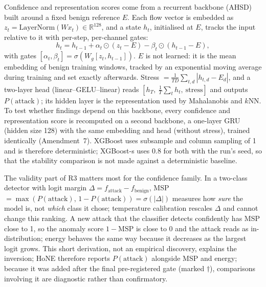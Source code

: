 \documentclass[conference]{IEEEtran}
\begin{document}
Confidence and representation scores come from a recurrent backbone (AHSD) built around a fixed benign reference $E$. Each flow vector is embedded as $z_t=\mathrm{LayerNorm}(Wx_t)\in\mathbb{R}^{128}$, and a state $h_t$, initialised at $E$, tracks the input relative to it with per-step, per-channel gates:
\begin{equation}
h_t = h_{t-1} + \alpha_t\odot(z_t - E) - \beta_t\odot(h_{t-1}-E),
\end{equation}
with gates $[\alpha_t,\beta_t]=\sigma(W_g[z_t,h_{t-1}])$.
$E$ is not learned: it is the mean embedding of benign training windows, tracked by an exponential moving average during training and set exactly afterwards. Stress $=\frac{1}{TD}\sum_{t,d}|h_{t,d}-E_d|$, and a two-layer head (linear--GELU--linear) reads $[h_T,\ \frac{1}{T}\sum_t h_t,\ \text{stress}]$ and outputs $P(\text{attack})$; its hidden layer is the representation used by Mahalanobis and $k$NN. To test whether findings depend on this backbone, every confidence and representation score is recomputed on a second backbone, a one-layer GRU (hidden size 128) with the same embedding and head (without stress), trained identically (Amendment~7). XGBoost uses subsample and column sampling of 1 and is therefore deterministic; XGBoost-s uses 0.8 for both with the run's seed, so that the stability comparison is not made against a deterministic baseline.

The validity part of R3 matters most for the confidence family. In a two-class detector with logit margin $\Delta=f_{\text{attack}}-f_{\text{benign}}$, MSP $=\max(P(\text{attack}),\,1-P(\text{attack}))=\sigma(|\Delta|)$ measures how \emph{sure} the model is, not \emph{which} class it chose; temperature calibration rescales $\Delta$ and cannot change this ranking. A new attack that the classifier detects confidently has MSP close to 1, so the anomaly score $1-\text{MSP}$ is close to 0 and the attack reads as in-distribution; energy behaves the same way because it decreases as the largest logit grows. This short derivation, not an empirical discovery, explains the inversion; HoNE therefore reports $P(\text{attack})$ alongside MSP and energy; because it was added after the final pre-registered gate (marked $\dagger$), comparisons involving it are diagnostic rather than confirmatory.
\end{document}
